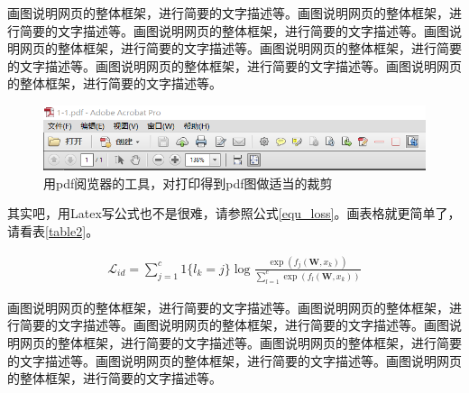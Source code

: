 \documentclass[supercite]{Experimental_Report}
\theoremstyle{definition}
\begin{document}
画图说明网页的整体框架，进行简要的文字描述等。画图说明网页的整体框架，进行简要的文字描述等。画图说明网页的整体框架，进行简要的文字描述等。画图说明网页的整体框架，进行简要的文字描述等。画图说明网页的整体框架，进行简要的文字描述等。画图说明网页的整体框架，进行简要的文字描述等。画图说明网页的整体框架，进行简要的文字描述等。

\begin{figure}[htb]
	\begin{center}
		\includegraphics[scale=0.50]{images/1-3.png}
		\caption{用pdf阅览器的工具，对打印得到pdf图做适当的裁剪}
		\label{fig1-3}
	\end{center}
\end{figure}

其实吧，用Latex写公式也不是很难，请参照公式\ref{equ_loss}。画表格就更简单了，请看表\ref{table2}。

\begin{eqnarray}\label{equ_loss}
	\mathcal{L}_{id}=\sum_{j=1}^{c}1\{l_k=j\}\log\frac{\exp(f_j(\textbf{W},x_k))}{\sum\nolimits_{l=1}^{c}\exp(f_l(\textbf{W},x_k))}
\end{eqnarray}

画图说明网页的整体框架，进行简要的文字描述等。画图说明网页的整体框架，进行简要的文字描述等。画图说明网页的整体框架，进行简要的文字描述等。画图说明网页的整体框架，进行简要的文字描述等。画图说明网页的整体框架，进行简要的文字描述等。画图说明网页的整体框架，进行简要的文字描述等。画图说明网页的整体框架，进行简要的文字描述等。
\end{document}
